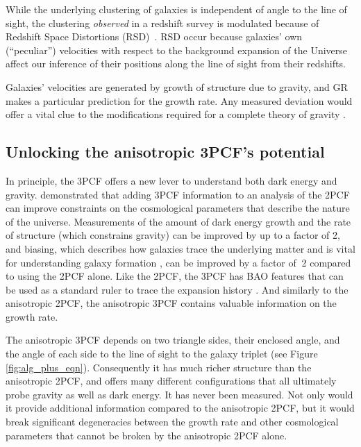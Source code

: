 While the underlying clustering of galaxies is independent of angle to the line of sight, the clustering {\it observed} in a redshift survey is modulated because of Redshift Space Distortions (RSD)~\cite{HamiltonRSD}. RSD occur because galaxies' own (``peculiar'') velocities with respect to the background expansion of the Universe affect our inference of their positions along the line of sight from their redshifts.  

Galaxies' velocities are generated by growth of structure due to gravity, and GR makes a particular prediction for the growth rate. Any measured deviation would offer a vital clue to the modifications required for a complete theory of gravity \cite{Lindergrowth}.

\subsection{Unlocking the anisotropic 3PCF's potential}
In principle, the 3PCF offers a new lever to understand both dark energy and gravity.  
\cite{Sefasutti2006} demonstrated that adding 3PCF information to an analysis of the 2PCF can improve constraints on the cosmological parameters that describe the nature of the universe. 
Measurements of the amount of dark energy growth and the rate of structure (which constrains gravity) can be improved by up to a factor of 2, and biasing, which describes how galaxies trace the underlying matter and is vital for understanding galaxy formation \cite{Fry1994,SERV,GilMarin2}, can be improved by a factor of $~$2 compared to using the 2PCF alone.
Like the 2PCF, the 3PCF has BAO features that can be used as a standard ruler to trace the expansion history \cite{SERSDmodel,SEBaoDetxn}.  And similarly to the anisotropic 2PCF, the anisotropic 3PCF contains valuable information on the growth rate. 

The anisotropic 3PCF depends on two triangle sides, their enclosed angle, and the angle of each side to the line of sight to the galaxy triplet (see Figure \ref{fig:alg_plus_eqn}). Consequently it has much richer structure than the anisotropic 2PCF, and offers many different configurations that all ultimately probe gravity \cite{RampfWong,Scoccimarro} as well as dark energy. 
It has never been measured. Not only would it provide additional information compared to the anisotropic 2PCF, but it would break significant degeneracies between the growth rate and other cosmological parameters that cannot be broken by the anisotropic 2PCF alone.

